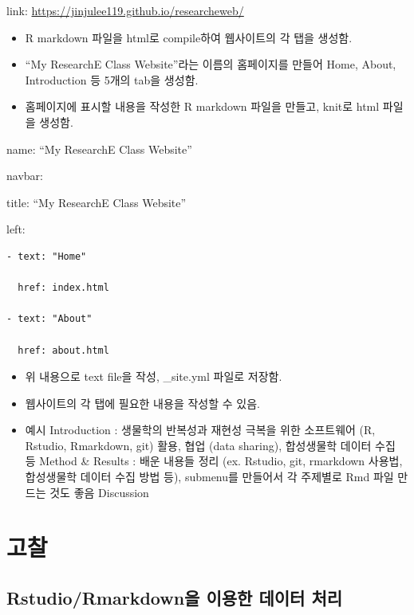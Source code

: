 \documentclass[
]{article}
\begin{document}
link: \url{https://jinjulee119.github.io/researcheweb/}

\begin{itemize}
\item
  R markdown 파일을 html로 compile하여 웹사이트의 각 탭을 생성함.
\item
  ``My ResearchE Class Website''라는 이름의 홈페이지를 만들어 Home,
  About, Introduction 등 5개의 tab을 생성함.
\item
  홈페이지에 표시할 내용을 작성한 R markdown 파일을 만들고, knit로 html
  파일을 생성함.
\end{itemize}

name: ``My ResearchE Class Website''

navbar:

title: ``My ResearchE Class Website''

left:

\begin{verbatim}
- text: "Home"

  href: index.html

- text: "About"

  href: about.html
\end{verbatim}

\begin{itemize}
\item
  위 내용으로 text file을 작성, \_site.yml 파일로 저장함.
\item
  웹사이트의 각 탭에 필요한 내용을 작성할 수 있음.
\item
  예시 Introduction : 생물학의 반복성과 재현성 극복을 위한 소프트웨어
  (R, Rstudio, Rmarkdown, git) 활용, 협업 (data sharing), 합성생물학
  데이터 수집 등 Method \& Results : 배운 내용들 정리 (ex. Rstudio, git,
  rmarkdown 사용법, 합성생물학 데이터 수집 방법 등), submenu를 만들어서
  각 주제별로 Rmd 파일 만드는 것도 좋음 Discussion
\end{itemize}

\hypertarget{uxace0uxcc30}{%
\section{고찰}\label{uxace0uxcc30}}

\hypertarget{rstudiormarkdownuxc744-uxc774uxc6a9uxd55c-uxb370uxc774uxd130-uxcc98uxb9ac}{%
\subsection{Rstudio/Rmarkdown을 이용한 데이터
처리}\label{rstudiormarkdownuxc744-uxc774uxc6a9uxd55c-uxb370uxc774uxd130-uxcc98uxb9ac}}
\end{document}
